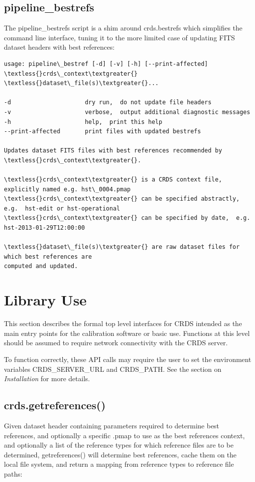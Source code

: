 \documentclass[letterpaper,10pt,english]{sphinxmanual}
\begin{document}
\section{pipeline\_bestrefs}
\label{command_line_tools:pipeline-bestrefs}
The pipeline\_bestrefs script is a shim around crds.bestrefs which simplifies the command line interface,
tuning it to the more limited case of updating FITS dataset headers with best references:

\begin{Verbatim}[commandchars=\\\{\}]
usage: pipeline\_bestref [-d] [-v] [-h] [--print-affected] \textless{}crds\_context\textgreater{} \textless{}dataset\_file(s)\textgreater{}...

-d                     dry run,  do not update file headers
-v                     verbose,  output additional diagnostic messages
-h                     help,  print this help
--print-affected       print files with updated bestrefs

Updates dataset FITS files with best references recommended by \textless{}crds\_context\textgreater{}.

\textless{}crds\_context\textgreater{} is a CRDS context file, explicitly named e.g. hst\_0004.pmap
\textless{}crds\_context\textgreater{} can be specified abstractly,  e.g.  hst-edit or hst-operational
\textless{}crds\_context\textgreater{} can be specified by date,  e.g.  hst-2013-01-29T12:00:00

\textless{}dataset\_file(s)\textgreater{} are raw dataset files for which best references are
computed and updated.
\end{Verbatim}


\chapter{Library Use}
\label{top_level_use:library-use}\label{top_level_use::doc}
This section describes the formal top level interfaces for CRDS intended as the
main entry points for the calibration software or basic use.  Functions
at this level should be assumed to require network connectivity with the CRDS
server.

To function correctly,  these API calls may require the user to set the
environment variables CRDS\_SERVER\_URL and CRDS\_PATH.   See the section on
\emph{Installation} for more details.


\section{crds.getreferences()}
\label{top_level_use:crds-getreferences}
Given  dataset header containing parameters required to determine best
references, and optionally a specific .pmap to use as the best references
context,  and optionally a list of the reference types for which reference files
are to be determined,  getreferences() will determine best references,  cache
them on the local file system,  and return a mapping from reference types to
reference file paths:
\end{document}
